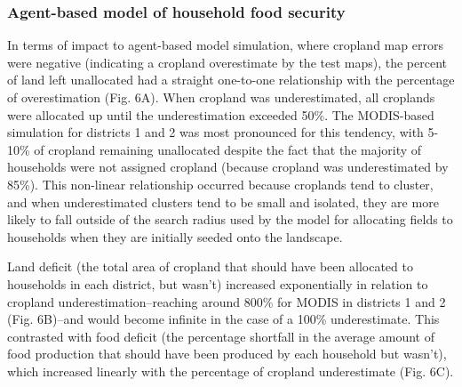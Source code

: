 \documentclass[a4paper]{article}
\begin{document}
\vspace{-0.3 cm}
\subsubsection*{Agent-based model of household food security}
\vspace{-0.2 cm}
In terms of impact to agent-based model simulation, where cropland map errors were negative (indicating a cropland overestimate by the test maps), the percent of land left unallocated had a straight one-to-one relationship with the percentage of overestimation (Fig. 6A). When cropland was underestimated, all croplands were allocated up until the underestimation exceeded 50\%. The MODIS-based simulation for districts 1 and 2 was most pronounced for this tendency, with 5-10\% of cropland remaining unallocated despite the fact that the majority of households were not assigned cropland (because cropland was underestimated by 85\%). This non-linear relationship occurred because croplands tend to cluster, and when underestimated clusters tend to be small and isolated, they are more likely to fall outside of the search radius used by the model for allocating fields to households when they are initially seeded onto the landscape. 

Land deficit (the total area of cropland that should have been allocated to households in each district, but wasn't) increased exponentially in relation to cropland underestimation--reaching around 800\% for MODIS in districts 1 and 2 (Fig. 6B)--and would become infinite in the case of a 100\% underestimate. This contrasted with food deficit (the percentage shortfall in the average amount of food production that should have been produced by each household but wasn't), which increased linearly with the percentage of cropland underestimate (Fig. 6C). 


\end{document}

